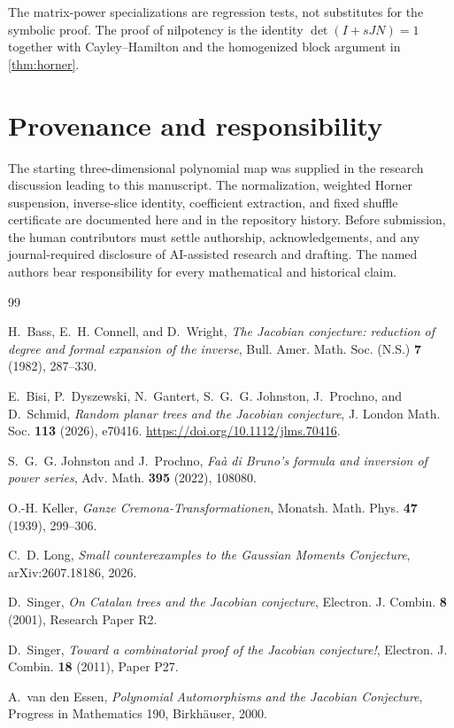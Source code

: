 \documentclass[11pt,reqno]{amsart}
\begin{document}
The matrix-power specializations are regression tests, not substitutes for
the symbolic proof.  The proof of nilpotency is the identity
$\det(I+sJN)=1$ together with Cayley--Hamilton and the homogenized block
argument in \cref{thm:horner}.

\section*{Provenance and responsibility}

The starting three-dimensional polynomial map was supplied in the research
discussion leading to this manuscript.  The normalization, weighted Horner
suspension, inverse-slice identity, coefficient extraction, and fixed
shuffle certificate are documented here and in the repository history.
Before submission, the human contributors must settle authorship,
acknowledgements, and any journal-required disclosure of AI-assisted
research and drafting.  The named authors bear responsibility for every
mathematical and historical claim.

\begin{thebibliography}{99}

H.~Bass, E.~H. Connell, and D.~Wright,
\emph{The Jacobian conjecture: reduction of degree and formal expansion of
the inverse},
Bull. Amer. Math. Soc. (N.S.) \textbf{7} (1982), 287--330.

E.~Bisi, P.~Dyszewski, N.~Gantert, S.~G.~G. Johnston, J.~Prochno,
and D.~Schmid,
\emph{Random planar trees and the Jacobian conjecture},
J. London Math. Soc. \textbf{113} (2026), e70416.
\url{https://doi.org/10.1112/jlms.70416}.

S.~G.~G. Johnston and J.~Prochno,
\emph{Fa\`a di Bruno's formula and inversion of power series},
Adv. Math. \textbf{395} (2022), 108080.

O.-H. Keller,
\emph{Ganze Cremona-Transformationen},
Monatsh. Math. Phys. \textbf{47} (1939), 299--306.

C.~D. Long,
\emph{Small counterexamples to the Gaussian Moments Conjecture},
arXiv:2607.18186, 2026.

D.~Singer,
\emph{On Catalan trees and the Jacobian conjecture},
Electron. J. Combin. \textbf{8} (2001), Research Paper R2.

D.~Singer,
\emph{Toward a combinatorial proof of the Jacobian conjecture!},
Electron. J. Combin. \textbf{18} (2011), Paper P27.

A.~van den Essen,
\emph{Polynomial Automorphisms and the Jacobian Conjecture},
Progress in Mathematics 190, Birkh\"auser, 2000.

\end{thebibliography}
\end{document}
